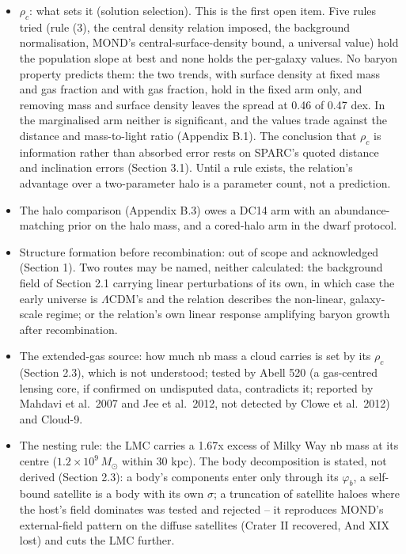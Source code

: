 \documentclass[
  10pt,
]{article}
\begin{document}
\begin{itemize}
\item $\rho_c$: what sets it (solution selection). This is the first open item. Five rules tried (rule (3), the central density relation imposed, the background normalisation, MOND's central-surface-density bound, a universal value) hold the population slope at best and none holds the per-galaxy values. No baryon property predicts them: the two trends, with surface density at fixed mass and gas fraction and with gas fraction, hold in the fixed arm only, and removing mass and surface density leaves the spread at 0.46 of 0.47 dex. In the marginalised arm neither is significant, and the values trade against the distance and mass-to-light ratio (Appendix B.1). The conclusion that $\rho_c$ is information rather than absorbed error rests on SPARC's quoted distance and inclination errors (Section 3.1). Until a rule exists, the relation's advantage over a two-parameter halo is a parameter count, not a prediction.
\item The halo comparison (Appendix B.3) owes a DC14 arm with an abundance-matching prior on the halo mass, and a cored-halo arm in the dwarf protocol.
\item Structure formation before recombination: out of scope and acknowledged (Section 1). Two routes may be named, neither calculated: the background field of Section 2.1 carrying linear perturbations of its own, in which case the early universe is $\Lambda$CDM's and the relation describes the non-linear, galaxy-scale regime; or the relation's own linear response amplifying baryon growth after recombination.
\item The extended-gas source: how much nb mass a cloud carries is set by its $\rho_c$ (Section 2.3), which is not understood; tested by Abell 520 (a gas-centred lensing core, if confirmed on undisputed data, contradicts it; reported by Mahdavi et al.~2007 and Jee et al.~2012, not detected by Clowe et al.~2012) and Cloud-9.
\item The nesting rule: the LMC carries a 1.67x excess of Milky Way nb mass at its centre ($1.2\times10^9\,M_\odot$ within 30 kpc). The body decomposition is stated, not derived (Section 2.3): a body's components enter only through its $\varphi_b$, a self-bound satellite is a body with its own $\sigma$; a truncation of satellite haloes where the host's field dominates was tested and rejected -- it reproduces MOND's external-field pattern on the diffuse satellites (Crater II recovered, And XIX lost) and cuts the LMC further.

\end{itemize}
\end{document}
